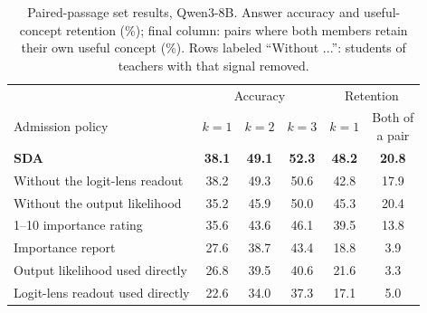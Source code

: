 \begin{table}[t]
\centering
\caption{Paired-passage set results, Qwen3-8B. Answer accuracy and useful-concept retention (\%); final column:
pairs where both members retain their own useful concept (\%). Rows labeled ``Without ...'': students of
teachers with that signal removed.}
\label{tab:crosspair}
\small
\setlength{\tabcolsep}{5pt}
\begin{tabular}{lccccc}
\toprule
& \multicolumn{3}{c}{Accuracy} & \multicolumn{2}{c}{Retention} \\
\cmidrule(lr){2-4}\cmidrule(lr){5-6}
Admission policy & $k=1$ & $k=2$ & $k=3$ & $k=1$ & \shortstack{Both of\\a pair} \\
\midrule
\textbf{SDA} & \textbf{38.1} & \textbf{49.1} & \textbf{52.3} & \textbf{48.2} & \textbf{20.8} \\
\addlinespace
Without the logit-lens readout & 38.2 & 49.3 & 50.6 & 42.8 & 17.9 \\
Without the output likelihood & 35.2 & 45.9 & 50.0 & 45.3 & 20.4 \\
1--10 importance rating \citep{park2023generative} & 35.6 & 43.6 & 46.1 & 39.5 & 13.8 \\
Importance report & 27.6 & 38.7 & 43.4 & 18.8 & 3.9 \\
Output likelihood used directly & 26.8 & 39.5 & 40.6 & 21.6 & 3.3 \\
Logit-lens readout used directly & 22.6 & 34.0 & 37.3 & 17.1 & 5.0 \\
\bottomrule
\end{tabular}
\end{table}
